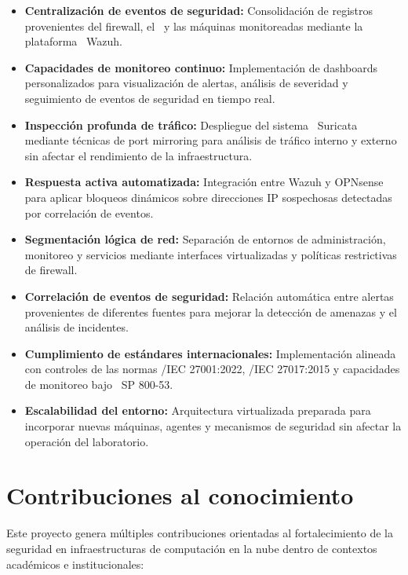 \begin{itemize}
    \item \textbf{Centralización de eventos de seguridad:} Consolidación de registros provenientes del firewall, el \IDPS\ y las máquinas monitoreadas mediante la plataforma \SIEM\ Wazuh.

    \item \textbf{Capacidades de monitoreo continuo:} Implementación de dashboards personalizados para visualización de alertas, análisis de severidad y seguimiento de eventos de seguridad en tiempo real.

    \item \textbf{Inspección profunda de tráfico:} Despliegue del sistema \IDPS\ Suricata mediante técnicas de port mirroring para análisis de tráfico interno y externo sin afectar el rendimiento de la infraestructura.

    \item \textbf{Respuesta activa automatizada:} Integración entre Wazuh y OPNsense para aplicar bloqueos dinámicos sobre direcciones IP sospechosas detectadas por correlación de eventos.

    \item \textbf{Segmentación lógica de red:} Separación de entornos de administración, monitoreo y servicios mediante interfaces virtualizadas y políticas restrictivas de firewall.

    \item \textbf{Correlación de eventos de seguridad:} Relación automática entre alertas provenientes de diferentes fuentes para mejorar la detección de amenazas y el análisis de incidentes.

    \item \textbf{Cumplimiento de estándares internacionales:} Implementación alineada con controles de las normas \ISO/IEC 27001:2022, \ISO/IEC 27017:2015 y capacidades de monitoreo bajo \NISTCSF\ SP 800-53.

    \item \textbf{Escalabilidad del entorno:} Arquitectura virtualizada preparada para incorporar nuevas máquinas, agentes y mecanismos de seguridad sin afectar la operación del laboratorio.
\end{itemize}

\section{Contribuciones al conocimiento}
\noindent

Este proyecto genera múltiples contribuciones orientadas al fortalecimiento de la seguridad en infraestructuras de computación en la nube dentro de contextos académicos e institucionales:

